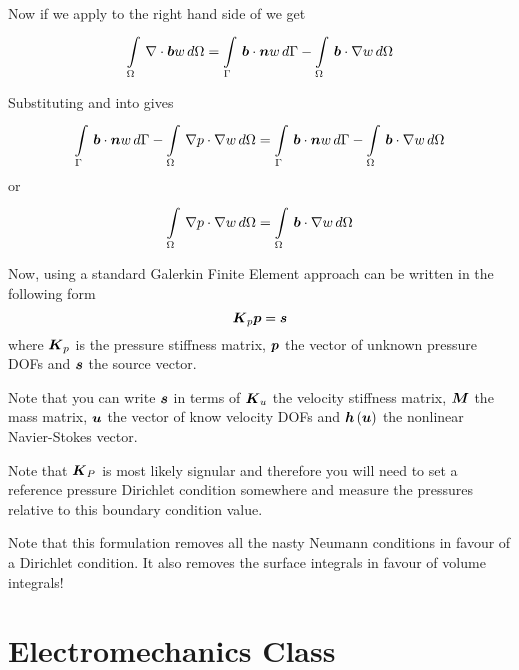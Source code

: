 Now if we apply  to the right hand
side of  we get
\begin{equation}
  \gint{\Omega}{}{\diverg{\vect{b}}w}{\Omega}=\gint{\Gamma}{}{\dotprod{\vect{b}}{\normal}w}{\Gamma}-
  \gint{\Omega}{}{\dotprod{\vect{b}}{\gradient{w}}}{\Omega}
  \label{eqn:PressurePoissonWeakFormRHS}
\end{equation}

Substituting  and
 into
 gives
\begin{equation}
  \gint{\Gamma}{}{\dotprod{\vect{b}}{\normal}w}{\Gamma}-
  \gint{\Omega}{}{\dotprod{\gradient{p}}{\gradient{w}}}{\Omega}=\gint{\Gamma}{}{\dotprod{\vect{b}}{\normal}w}{\Gamma}-
  \gint{\Omega}{}{\dotprod{\vect{b}}{\gradient{w}}}{\Omega}
\end{equation} 
or
\begin{equation}
  \gint{\Omega}{}{\dotprod{\gradient{p}}{\gradient{w}}}{\Omega}=\gint{\Omega}{}{\dotprod{\vect{b}}{\gradient{w}}}{\Omega}
  \label{eqn:PressurePoissonFinalWeakForm}
\end{equation}

Now, using a standard Galerkin Finite Element approach
 can be written in the following form
 \begin{equation}
   \matr{K}_{p}\vect{p}=\vect{s}
  \label{eqn:PressurePoissonFinalWeakForm}
\end{equation}
where $\matr{K}_{p}$ is the pressure stiffness matrix, $\vect{p}$ the vector of unknown
pressure DOFs and $\vect{s}$ the source vector. 

Note that you can write
$\vect{s}$ in terms of $\matr{K}_{u}$ the velocity
stiffness matrix, $\matr{M}$ the mass matrix, $\vect{u}$ the vector of know
velocity DOFs and $\fnof{\vect{h}}{\vect{u}}$ the nonlinear Navier-Stokes
vector.

Note that $\matr{K}_{P}$ is most likely signular and therefore you will need to
set a reference pressure Dirichlet condition somewhere and measure the
pressures relative to this boundary condition value.

Note that this formulation removes all the nasty Neumann conditions in favour
of a Dirichlet condition. It also removes the surface integrals in favour of
volume integrals!

\newpage
\section{Electromechanics Class}

